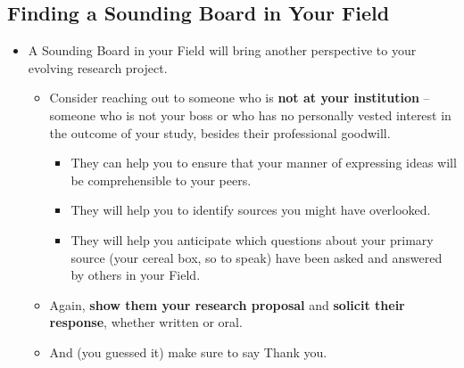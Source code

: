 \documentclass[11pt]{article}
\begin{document}
\subsection{Finding a Sounding Board in Your Field}
\begin{itemize}
\item \begin{exercise}
A Sounding Board in your Field will bring another perspective to your evolving research project. 
\begin{itemize}
\item Consider reaching out to someone who is \textbf{not at your institution} -- someone who is not your boss or who has no personally vested interest in the outcome of your study, besides their professional goodwill. 
\begin{itemize}
\item They can help you to ensure that your manner of expressing ideas will be comprehensible to your peers. 

\item They will help you to identify sources you might have overlooked. 

\item They will help you anticipate which questions about your primary source (your cereal box, so to speak) have been asked and answered by others
in your Field. 
\end{itemize}

\item Again, \textbf{show them your research proposal} and \textbf{solicit their response}, whether written or oral. 

\item And (you guessed it) make sure to say Thank you.
\end{itemize}
\end{exercise}
\end{itemize}
\end{document}
